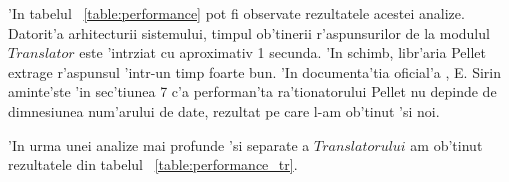 \documentclass[12pt,a4paper,twoside]{report}
\begin{document}
'In tabelul ~\ref{table:performance} pot fi observate rezultatele acestei analize. Datorit'a arhitecturii sistemului, timpul ob'tinerii r'aspunsurilor de la modulul $Translator$ este 'int\ia rziat cu aproximativ 1 secunda. 'In schimb, libr'aria Pellet extrage r'aspunsul 'intr-un timp foarte bun. 'In documenta'tia oficial'a \cite{SirinPellet:Reasoner}, E. Sirin aminte'ste 'in sec'tiunea 7 c'a performan'ta ra'tionatorului Pellet nu depinde de dimnesiunea num'arului de date, rezultat pe care l-am ob'tinut 'si noi.
\begin{table}
\caption{Performan'ta sistemului}
\centering            
\label{table:performance}                %
\end{table}
'In urma unei analize mai profunde 'si separate a $Translatorului$ am ob'tinut rezultatele din tabelul ~\ref{table:performance_tr}. 
\end{document}
